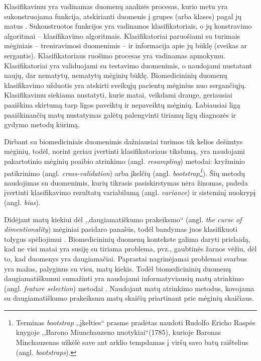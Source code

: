  Klasifikavimu yra vadinamas duomenų analizės procesas, kurio metu yra sukonstruojama funkcija, atskirianti duomenis į grupes (arba klases) pagal jų matus \cite{fisher1936use}. Sukonstruotos funkcijos yra vadinamos klasifikatoriais, o jų konstravimo algoritmai -- klasifikavimo algoritmais. Klasifikatoriai paruošiami su turimais mėginiais -- treniravimosi duomenimis -- ir informacija apie jų būklę (sveikas ar sergantis). Klasifikatoriaus ruošimo procesas yra vadinamas apmokymu. Klasifikatoriai yra validuojami su testavimo duomenimis, o naudojami nustatant naujų, dar nematytų, nematytų mėginių būklę. Biomedicininių duomenų klasifikavimo užduotis yra atskirti sveikųjų pacientų mėginius nuo sergančiųjų. Klasifikavimu siekiama nustatyti, kurie matai, veikdami drauge, geriausiai paaiškina skirtumą tarp ligos paveiktų ir nepaveiktų mėginių. Labiausiai ligą paaiškinančių matų nustatymas galėtų palengvinti tiriamų ligų diagnozės ir gydymo metodų kūrimą.

Dirbant su biomediciniais duomenimis dažniausiai turimos tik kelios dešimtys mėginių, todėl, norint geriau įvertinti klasifikatoriaus tikslumą, yra naudojami pakartotinio mėginių poaibio atrinkimo (angl. \textit{resampling}) metodai: kryžminio patikrinimo (angl. \textit{cross-validation}) arba įkelčių (angl. \textit{bootstrap\footnote{Terminas \textit{bootstrap} ,,įkelties`` prasme pradėtas naudoti Rudolfo Ericho Raspės knygoje ,,Barono Miunchauzeno nuotykiai``(1785), kurioje Baronas Minchauzenas užkėlė save ant arklio tempdamas į viršų savo batų raištelius (angl. \textit{bootstraps}).}}). Šių metodų naudojimas su duomenimis, kurių tikrasis pasiskirstymas nėra žinomas, padeda įvertinti klasifikavimo rezultatų variabilumą (angl. \textit{variance}) ir sisteminį nuokrypį (angl. \textit{bias}).

Didėjant matų kiekiui dėl ,,daugiamatiškumo prakeiksmo`` (angl. \textit{the curse of dimentionality})  mėginiai pasidaro panašūs, todėl bandymas juos klasifikuoti tolygus spėliojimui \cite{bellman1966adaptive}. Biomedicininių duomenų kontekste galima daryti prielaidą, kad ne visi matai yra susiję su tiriama problema, pvz., gaubtinės žarnos vėžiu, dėl to, kad duomenys yra daugiamačiai. Paprastai nagrinėjamai problemai svarbus yra mažas, palyginus su visu, matų kiekis.  Todėl biomedicininių duomenų daugiamatiškumui sumažinti yra naudojami informatyviausių matų atrinkimo (angl. \textit{feature selection}) metodai \cite{guyon2003introduction}. Naudojant matų atrinkimo metodus, kovojama su daugiamatiškumo prakeiksmu matų skaičių priartinant prie mėginių skaičiaus.

